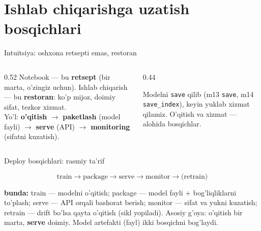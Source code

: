\documentclass[aspectratio=169,11pt]{beamer}
\newcommand{\bunda}[1]{{\small\textbf{bunda:}\; #1}}
\begin{document}
\section[Deploy]{Ishlab chiqarishga uzatish bosqichlari}

\begin{frame}{Intuitsiya: oshxona retsepti emas, restoran}
  \begin{columns}[T]
    \begin{column}{0.52\textwidth}
      \small
      Notebook --- bu \textbf{retsept} (bir marta, o'zingiz uchun). Ishlab
      chiqarish --- bu \textbf{restoran}: ko'p mijoz, doimiy sifat, tezkor xizmat.\\[5pt]
      Yo'l: \textbf{o'qitish} $\to$ \textbf{paketlash} (model fayli) $\to$
      \textbf{serve} (API) $\to$ \textbf{monitoring} (sifatni kuzatish).
    \end{column}
    \begin{column}{0.44\textwidth}
      \begin{tcolorbox}[okbox,top=2pt,bottom=2pt]
        \footnotesize
        Modelni \texttt{save} qilib (m13 \texttt{save}, m14 \texttt{save\_index}),
        keyin yuklab xizmat qilamiz. O'qitish va xizmat --- alohida bosqichlar.
      \end{tcolorbox}
    \end{column}
  \end{columns}
\end{frame}

\begin{frame}{Deploy bosqichlari: rasmiy ta'rif}
  \begin{tcolorbox}[defbox,title={Ta'rif: model hayot sikli}]
    \vspace{-0.4em}
    $$ \text{train} \rightarrow \text{package} \rightarrow \text{serve}
       \rightarrow \text{monitor} \rightarrow \text{(retrain)} $$
  \end{tcolorbox}
  \vspace{2pt}
  \bunda{train --- modelni o'qitish; package --- model fayli $+$ bog'liqliklarni
  to'plash; serve --- API orqali bashorat berish; monitor --- sifat va yukni
  kuzatish; retrain --- drift bo'lsa qayta o'qitish (sikl yopiladi).}
  \vspace{4pt}
  \footnotesize Asosiy g'oya: o'qitish bir marta, \textbf{serve} doimiy.
  Model artefakti (fayl) ikki bosqichni bog'laydi.
\end{frame}
\end{document}
